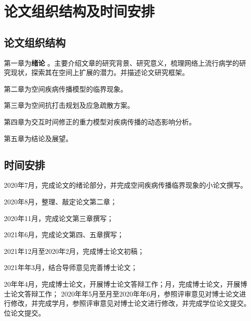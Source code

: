 \chapter{论文组织结构及时间安排}

\section{论文组织结构}

第一章为\textbf{绪论} 。主要介绍文章的研究背景、研究意义，梳理网络上流行病学的研究现状，探索其在空间上扩展的潜力。并描述论文研究框架。

第二章为空间疾病传播模型的临界现象。

第三章为空间抗打击规划及应急疏散方案。

第四章为交互时间修正的重力模型对疾病传播的动态影响分析。

第五章为结论及展望。

\section{时间安排}

2020年7月，完成论文的绪论部分，并完成空间疾病传播临界现象的小论文撰写。

2020年8月，整理、敲定论文第二章；

2020年11月，完成论文第三章撰写；

2021年6月，完成论文第四、五章撰写；

2021年12月至2020年2月，完成博士论文初稿；

2021年年3月，结合导师意见完善博士论文；

20年年4月，完成博士论文，开展博士论文答辩工作；月，完成博士论文，开展博士论文答辩工作；
2020年年5月至月至2020年年6月，参照评审意见对博士论文进行修改，并完成学月，参照评审意见对博士论文进行修改，并完成学位论文提交。位论文提交。


